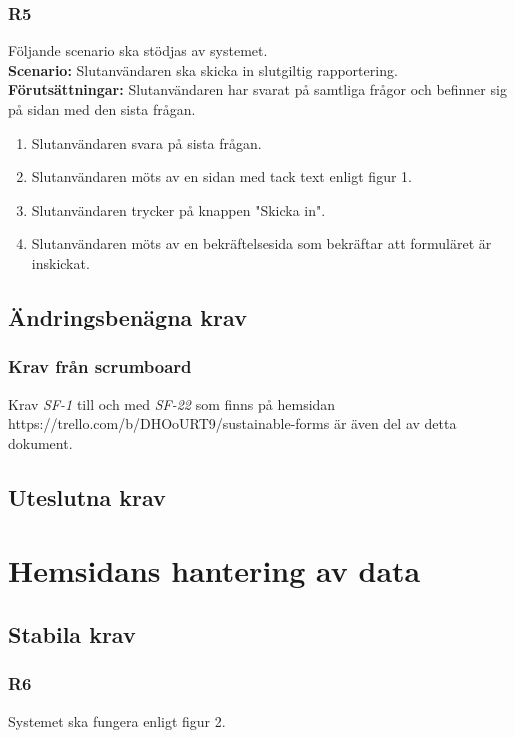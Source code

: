 \documentclass{article}
\begin{document}
        \subsubsection*{R5}
    Följande scenario ska stödjas av systemet.
        \\
       \indent \textbf{Scenario:} Slutanvändaren ska skicka in slutgiltig rapportering.
        \\
       \indent \textbf{Förutsättningar:} Slutanvändaren har svarat på samtliga frågor och befinner sig på sidan med den sista frågan.
            \begin{enumerate}
                \item Slutanvändaren svara på sista frågan.
                \item Slutanvändaren möts av en sidan med tack text enligt figur 1.
                \item Slutanvändaren trycker på knappen "Skicka in".
                \item  Slutanvändaren möts av en bekräftelsesida som bekräftar att formuläret är inskickat.
            \end{enumerate}

\subsection*{Ändringsbenägna krav}

\subsubsection*{Krav från scrumboard}
Krav \textit{SF-1} till och med \textit{SF-22} som finns på hemsidan https://trello.com/b/DHOoURT9/sustainable-forms är även del av detta dokument.


    \subsection*{Uteslutna krav}
    
    \newpage
     \section{Hemsidans hantering av data}
    
    \subsection*{Stabila krav}
    \subsubsection*{R6}
    Systemet ska fungera enligt figur 2.
    
\end{document}
